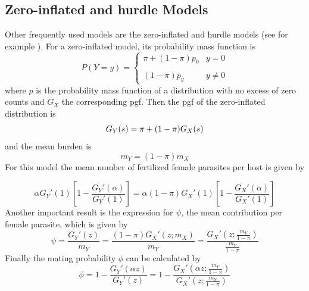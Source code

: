 \documentclass[12pt,a4paper]{article}
\theoremstyle{plain}%
\theoremstyle{definition}
\theoremstyle{remark}
\begin{document}
	\subsection{Zero-inflated and hurdle Models}
	Other frequently used models  are the zero-inflated and hurdle models (see for example  \citep{abdybekova2012frequency,crofton1971quantitative,denwood2008distribution,ziadinov2010frequency}).
	For a zero-inflated model, its probability mass function is 
	\begin{equation*}\label{zid}
	P(Y=y)= \left\{ \begin{array}{lc}
	\pi + (1-\pi)p_0 & y=0 \\
	\\ (1-\pi)p_y  & y\neq 0
	\end{array}
	\right.
	\end{equation*}
	where $p$ is the probability mass function of a distribution with no excess of zero counts and $G_X$ the corresponding pgf. 
	Then the pgf of the zero-inflated distribution is
	\begin{equation*}
	G_Y(s)=\pi+(1-\pi)G_X(s)\\
	\end{equation*}
	and the mean burden is  %
		\begin{equation*}
	m_Y=(1-\pi)m_X
	\end{equation*}
	For this model the mean number of fertilized female parasites per host is given by
	

	\begin{equation*}
	\alpha G_Y'(1) \left[1-  \frac{G_Y'(\alpha )}{ G_Y'(1)}\right]=\alpha (1-\pi) G_X'(1) 
	\left[1 - \frac{G_X'(\alpha)}{G_X'(1)}\right]    
	\end{equation*}
	Another important result is the expression for $\psi$, the mean contribution per female parasite, which is given by
	\begin{equation}\label{zipsi}
	\psi= \frac{G_Y'(z)}{m_Y}=  \frac{(1-\pi)G_X'(z;m_X)}{m_Y}=\frac{G_X'\left( z;\frac{m_Y}{1-\pi}\right) }{\frac{m_Y}{1-\pi}} 
	\end{equation}
	Finally the mating probability $\phi$ can be calculated by     
	\begin{equation}\label{ziphi}
	\phi=1-\frac{G_Y'(\alpha z)}{G_Y'(z)}=1-\frac{G_X'\left(\alpha z;\frac{m_Y}{1-\pi}\right)}{G_X'\left( z;\frac{m_Y}{1-\pi}\right)} 
	\end{equation}
	
\end{document}
